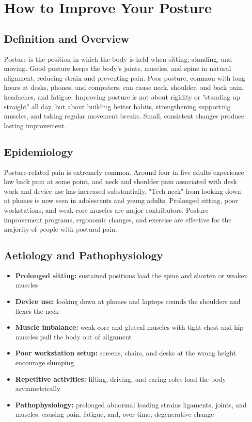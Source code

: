 \chapter{How to Improve Your Posture}

\section*{Definition and Overview}
Posture is the position in which the body is held when sitting, standing, and moving. Good posture keeps the body's joints, muscles, and spine in natural alignment, reducing strain and preventing pain. Poor posture, common with long hours at desks, phones, and computers, can cause neck, shoulder, and back pain, headaches, and fatigue. Improving posture is not about rigidity or "standing up straight" all day, but about building better habits, strengthening supporting muscles, and taking regular movement breaks. Small, consistent changes produce lasting improvement.

\section*{Epidemiology}
Posture-related pain is extremely common. Around four in five adults experience low back pain at some point, and neck and shoulder pain associated with desk work and device use has increased substantially. "Tech neck" from looking down at phones is now seen in adolescents and young adults. Prolonged sitting, poor workstations, and weak core muscles are major contributors. Posture improvement programs, ergonomic changes, and exercise are effective for the majority of people with postural pain.

\section*{Aetiology and Pathophysiology}
\begin{itemize}
    \item \textbf{Prolonged sitting:} sustained positions load the spine and shorten or weaken muscles
    \item \textbf{Device use:} looking down at phones and laptops rounds the shoulders and flexes the neck
    \item \textbf{Muscle imbalance:} weak core and gluteal muscles with tight chest and hip muscles pull the body out of alignment
    \item \textbf{Poor workstation setup:} screens, chairs, and desks at the wrong height encourage slumping
    \item \textbf{Repetitive activities:} lifting, driving, and caring roles load the body asymmetrically
    \item \textbf{Pathophysiology:} prolonged abnormal loading strains ligaments, joints, and muscles, causing pain, fatigue, and, over time, degenerative change
\end{itemize}

